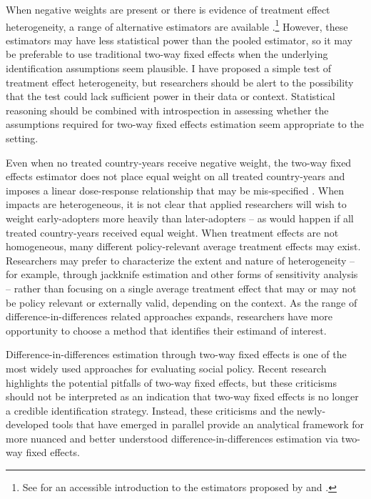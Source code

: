 \documentclass[11pt]{article}
\begin{document}
When negative weights are present or there is evidence of treatment effect heterogeneity, a range of alternative estimators are available .\footnote{See  for an accessible introduction to the estimators proposed by \cite{CallawaySantanna2020} and \cite{SunAbraham2020}.}  However, these estimators may have less statistical power than the pooled estimator, 
so it may be preferable to use traditional two-way fixed effects when the underlying identification assumptions seem plausible.  I have proposed a simple 
test of treatment effect heterogeneity, but researchers should be alert to the possibility that the test could lack sufficient power in their data or context.  Statistical reasoning should be combined with introspection in assessing whether the assumptions required for two-way fixed effects estimation seem appropriate to the setting.

Even when no treated country-years receive negative weight, the two-way fixed effects estimator does not place equal weight on all treated country-years and imposes a linear dose-response relationship that may be mis-specified \cite{Baker2021,SunAbraham2020}.  When impacts are heterogeneous, it is not clear that applied researchers will wish to weight early-adopters more heavily than later-adopters -- as would happen if all treated country-years received equal weight.  When treatment effects are not homogeneous, many different policy-relevant average treatment effects may exist.  Researchers may prefer to characterize the extent and nature of heterogeneity -- for example, through jackknife estimation and other forms of sensitivity analysis -- rather than focusing on a single average treatment effect that may or may not be policy relevant or externally valid, depending on the context.  As the range of difference-in-differences related approaches expands, researchers have more opportunity to choose a method that identifies their estimand of interest.

Difference-in-differences estimation through two-way fixed effects is one of the most widely used approaches for evaluating social policy.  Recent research highlights the potential pitfalls of two-way fixed effects, but these criticisms should not be interpreted as an indication that two-way fixed effects is no longer a credible identification strategy.  Instead, these criticisms and the newly-developed tools that have emerged in parallel provide an analytical framework for more nuanced and better understood difference-in-differences estimation via two-way fixed effects.
\end{document}
